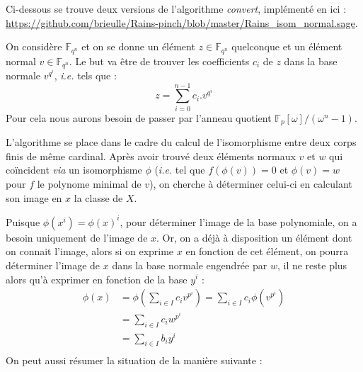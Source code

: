 \documentclass[a4paper]{article} %
\numberwithin{equation}{section}
\newcommand\GF[1]{\mathbb{F}_{#1}}
\begin{document}
\newtheorem{thm}{Thèorème}
\newtheorem{lem}[thm]{Lemme}
\newtheorem{cor}{Corollaire}
\newtheorem{prop}[thm]{Proposition}
\theoremstyle{definition}
\newtheorem*{defn}{Définition}
\newtheorem*{ex}{Exemple}
\theoremstyle{remark}
\newtheorem*{rem}{Remarque}
Ci-dessous se trouve deux versions de l'algorithme \textit{convert}, implémenté en  ici : \url{https://github.com/brieulle/Rains-pinch/blob/master/Rains\_isom\_normal.sage}.\\\par
On considère $\GF{q^n}$ et on se donne un élément $z\in\GF{q^n}$ quelconque et un élément normal $v\in\GF{q^n}$. Le but va être de trouver les coefficients $c_i$ de $z$ dans la base normale $v^{q^i}$, \textit{i.e.} tels que :
\[z = \sum_{i=0}^{n-1}{c_i.v^{q^i}}\]
Pour cela nous aurons besoin de passer par l'anneau quotient $\mathbb{F}_p[\omega]/(\omega^n - 1)$.\\\par
L'algorithme se place dans le cadre du calcul de l'isomorphisme entre deux corps finis de même cardinal. Après avoir trouvé deux éléments normaux $v$ et $w$ qui coïncident \textit{via} un isomorphisme $\phi$ (\textit{i.e.} tel que $f(\phi(v)) = 0$ et $\phi(v) = w$ pour $f$ le polynome minimal de $v$), on cherche à déterminer celui-ci en calculant son image en $x$ la classe de $X$.\par

Puisque $\phi(x^i) = \phi(x)^i$, pour déterminer l'image de la base polynomiale, on a besoin uniquement de l'image de $x$. Or, on a déjà à disposition un élément dont on connait l'image, alors si on exprime $x$ en fonction de cet élément, on pourra déterminer l'image de $x$ dans la base normale engendrée par $w$, il ne reste plus alors qu'à exprimer en fonction de la base $y^i$ :
\begin{align*}
\phi(x) &= \phi(\sum_{i\in I}{c_iv^{p^i}})= \sum_{i\in I}{c_i\phi(v^{p^i})}\\
&= \sum_{i\in I}{c_iw^{p^i}}\\
&= \sum_{i\in I}{b_iy^i}\\
\end{align*}
On peut aussi résumer la situation de la manière suivante :
\end{document}
